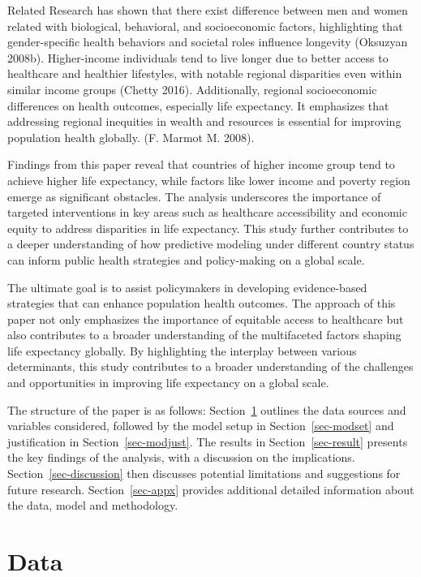 \documentclass[
  letterpaper,
  DIV=11,
  numbers=noendperiod]{scrartcl}
\begin{document}
Related Research has shown that there exist difference between men and
women related with biological, behavioral, and socioeconomic factors,
highlighting that gender-specific health behaviors and societal roles
influence longevity (Oksuzyan 2008b). Higher-income individuals tend to
live longer due to better access to healthcare and healthier lifestyles,
with notable regional disparities even within similar income groups
(Chetty 2016). Additionally, regional socioeconomic differences on
health outcomes, especially life expectancy. It emphasizes that
addressing regional inequities in wealth and resources is essential for
improving population health globally. (F. Marmot M. 2008).

Findings from this paper reveal that countries of higher income group
tend to achieve higher life expectancy, while factors like lower income
and poverty region emerge as significant obstacles. The analysis
underscores the importance of targeted interventions in key areas such
as healthcare accessibility and economic equity to address disparities
in life expectancy. This study further contributes to a deeper
understanding of how predictive modeling under different country status
can inform public health strategies and policy-making on a global scale.

The ultimate goal is to assist policymakers in developing evidence-based
strategies that can enhance population health outcomes. The approach of
this paper not only emphasizes the importance of equitable access to
healthcare but also contributes to a broader understanding of the
multifaceted factors shaping life expectancy globally. By highlighting
the interplay between various determinants, this study contributes to a
broader understanding of the challenges and opportunities in improving
life expectancy on a global scale.

The structure of the paper is as follows: Section~\ref{sec-data}
outlines the data sources and variables considered, followed by the
model setup in Section~\ref{sec-modset} and justification in
Section~\ref{sec-modjust}. The results in Section~\ref{sec-result}
presents the key findings of the analysis, with a discussion on the
implications. Section~\ref{sec-discussion} then discusses potential
limitations and suggestions for future research. Section~\ref{sec-appx}
provides additional detailed information about the data, model and
methodology.

\section{Data}\label{sec-data}
\end{document}
